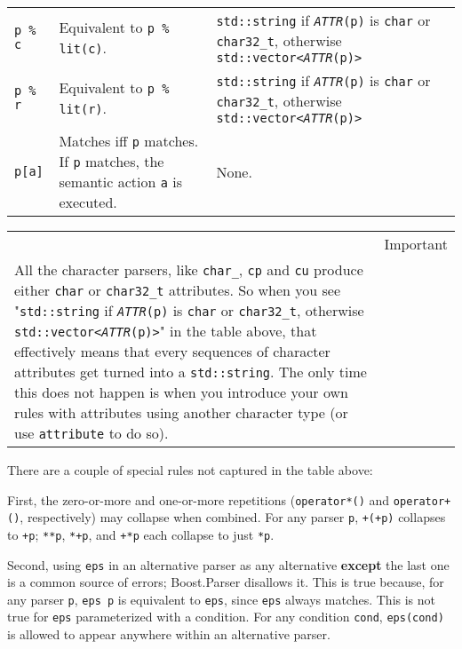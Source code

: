 \begin{longtable}[]{@{}llll@{}}
\texttt{p \% c} & Equivalent to \texttt{p \% lit(c)}. & \texttt{std::string} if \emph{\texttt{ATTR}}\texttt{(p)} is \texttt{char} or \texttt{char32\_t}, otherwise \texttt{std::vector<}\emph{\texttt{ATTR}}\texttt{(p)>} & \\
\texttt{p \% r} & Equivalent to \texttt{p \% lit(r)}. & \texttt{std::string} if \emph{\texttt{ATTR}}\texttt{(p)} is \texttt{char} or \texttt{char32\_t}, otherwise \texttt{std::vector<}\emph{\texttt{ATTR}}\texttt{(p)>} & \\
\texttt{p{[}a{]}} & Matches iff \texttt{p} matches. If \texttt{p} matches, the semantic action \texttt{a} is executed. & None. & \\
\end{longtable}

\hfill\break

\begin{longtable}[]{@{}
  >{\raggedright\arraybackslash}p{}
  >{\raggedright\arraybackslash}p{}@{}}
\toprule\noalign{}
\endhead
\bottomrule\noalign{}
\endlastfoot
\begin{minipage}[t]{\linewidth}\raggedright
\end{minipage} & Important \\
All the character parsers, like \texttt{char\_}, \texttt{cp} and \texttt{cu} produce either \texttt{char} or \texttt{char32\_t} attributes. So when you see "\texttt{std::string} if \emph{\texttt{ATTR}}\texttt{(p)} is \texttt{char} or \texttt{char32\_t}, otherwise \texttt{std::vector<}\emph{\texttt{ATTR}}\texttt{(p)>}" in the table above, that effectively means that every sequences of character attributes get turned into a \texttt{std::string}. The only time this does not happen is when you introduce your own rules with attributes using another character type (or use \texttt{attribute} to do so). & \\
\end{longtable}

There are a couple of special rules not captured in the table above:

First, the zero-or-more and one-or-more repetitions (\texttt{operator*()} and \texttt{operator+()}, respectively) may collapse when combined. For any parser \texttt{p}, \texttt{+(+p)} collapses to \texttt{+p}; \texttt{**p}, \texttt{*+p}, and \texttt{+*p} each collapse to just \texttt{*p}.

Second, using \texttt{eps} in an alternative parser as any alternative \textbf{except} the last one is a common source of errors; Boost.Parser disallows it. This is true because, for any parser \texttt{p}, \texttt{eps \textbar{} p} is equivalent to \texttt{eps}, since \texttt{eps} always matches. This is not true for \texttt{eps} parameterized with a condition. For any condition \texttt{cond}, \texttt{eps(cond)} is allowed to appear anywhere within an alternative parser.

